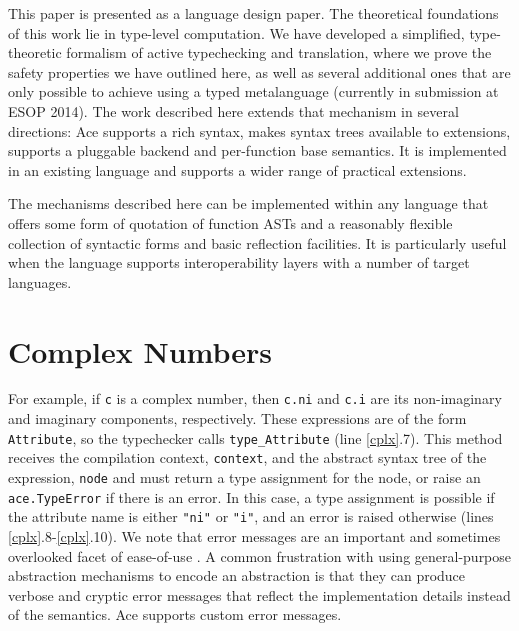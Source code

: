\documentclass[10pt,preprint]{sigplanconf}
\begin{document}
{This paper is presented as a language design paper. The theoretical foundations of this work lie in type-level computation. We have developed a simplified, type-theoretic formalism of active typechecking and translation, where we prove the safety properties we have outlined here, as well as several additional ones that are only possible to achieve using a typed metalanguage (currently in submission at ESOP 2014). The work described here  extends that mechanism in several directions: Ace supports a rich syntax, makes syntax trees available to extensions, supports a pluggable backend and per-function base semantics. It is implemented in an existing language and supports a wider range of practical extensions. 

The mechanisms described here can be implemented within any language that offers some form of quotation of function ASTs and a reasonably flexible collection of syntactic forms and basic reflection facilities. It is particularly useful when the language supports interoperability layers with a number of target languages. 








\appendix
\section{Complex Numbers}
For example, if \verb|c| is a complex number, then \verb|c.ni| and \verb|c.i| are its non-imaginary and imaginary components, respectively. These expressions are of the form \verb|Attribute|, so the typechecker calls \verb|type_Attribute| (line \ref{cplx}.7).
This method receives the compilation context, \verb|context|, and the abstract syntax tree of the expression, \verb|node| and must return a type assignment for the node, or raise an \verb|ace.TypeError| if there is an error. In this case, a type assignment is possible if the attribute name is either \verb|"ni"| or \verb|"i"|, and an error is raised otherwise (lines \ref{cplx}.8-\ref{cplx}.10). We note that error messages are an important and sometimes overlooked facet of {ease-of-use} \cite{marceau2011measuring}. A common frustration with using general-purpose abstraction mechanisms to encode an abstraction is that they can produce  verbose and cryptic error messages that reflect the implementation details instead of the semantics. Ace supports custom error messages.%

}
\end{document}

